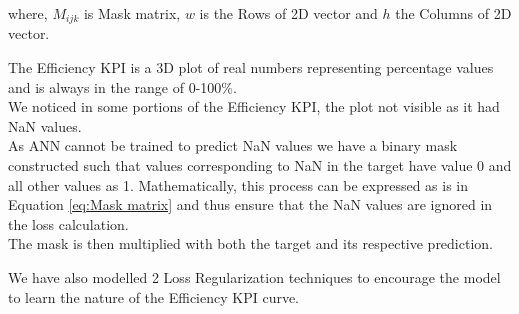 \documentclass{report} %
\begin{document}
where, \(M_{ijk}\) is Mask matrix, \(w\) is the Rows of 2\ac{D} vector and \(h\) the Columns of 2\ac{D} vector.

The Efficiency \ac{KPI} is a 3\ac{D} plot of real numbers representing percentage values and is always in the range of 0-100\%.\\
We noticed in some portions of the Efficiency \ac{KPI}, the plot not visible as it had \ac{NaN} values.\\
As ANN cannot be trained to predict \ac{NaN} values we have a binary mask constructed such that values corresponding to \ac{NaN} in the target have value 0 and all other values as 1.
Mathematically, this process can be expressed as is in Equation \ref{eq:Mask matrix} and thus ensure that the \ac{NaN} values are ignored in the loss calculation. \\ 
The mask is then multiplied with both the target and its respective prediction. 

We have also modelled 2 Loss Regularization techniques to encourage the model to learn the nature of the Efficiency \ac{KPI} curve.\\
\end{document}
